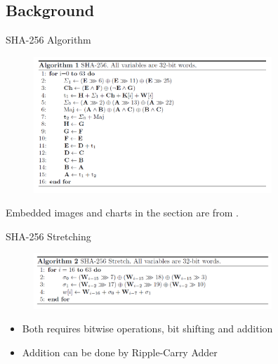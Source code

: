 \documentclass{beamer}
\begin{document}
    \subsection{Background}
    \begin{frame}{SHA-256 Algorithm}
        \begin{figure}[h]
            \centering
            \includegraphics[width=0.8\textwidth]{./Images/quant-sha2-circ.png}
        \end{figure}
        Embedded images and charts in the section are from \cite{amy2016estimating}.
    \end{frame}

    \begin{frame}{SHA-256 Stretching}
        \begin{figure}[h]
            \centering
            \includegraphics[width=0.8\textwidth]{./Images/quant-sha2-stretch.png}
        \end{figure}
        \begin{itemize}
            \item Both requires bitwise operations, bit shifting and addition
            \item Addition can be done by Ripple-Carry Adder
        \end{itemize}
    \end{frame}
    
\end{document}

